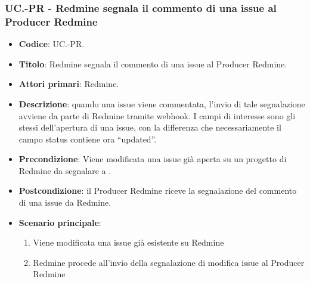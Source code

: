 \subsubsection{UC\theuccount.\thesubuccount-PR - Redmine segnala il commento di una issue al Producer Redmine}
\begin{itemize}
	\item \textbf{Codice}: UC\theuccount.\thesubuccount-PR.
	\item \textbf{Titolo}: Redmine segnala il commento di una issue al Producer Redmine.
	\item \textbf{Attori primari}: Redmine.
	\item \textbf{Descrizione}: quando una issue viene commentata, l'invio di tale segnalazione
	avviene da parte di Redmine tramite webhook.
	I campi di interesse sono gli stessi dell'apertura di una issue, con la differenza che necessariamente il campo status contiene ora ``updated''.
	\item \textbf{Precondizione}: Viene modificata una issue già aperta su un
	progetto di Redmine da segnalare a \progetto.
	\item \textbf{Postcondizione}: il Producer Redmine riceve la segnalazione del commento di una issue da Redmine.
	\item \textbf{Scenario principale}: 
	\begin{enumerate}
		\item Viene modificata una issue già esistente su Redmine
		\item Redmine procede all'invio della segnalazione di modifica issue al Producer Redmine
	\end{enumerate}
	
\end{itemize}
